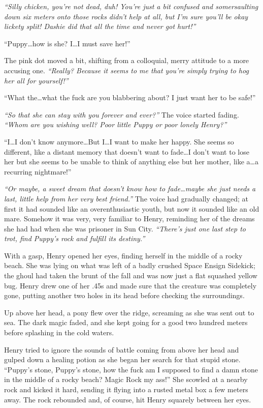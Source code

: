 \emph{``Silly chicken, you're not dead, duh! You're just a bit confused and somersaulting down six meters onto those rocks didn't help at all, but I'm sure you'll be okay lickety split! Dashie did that all the time and never got hurt!''}

``Puppy\dots how is she? I\dots I must save her!''

The pink dot moved a bit, shifting from a colloquial, merry attitude to a more accusing one. \emph{``Really? Because it seems to me that you're simply trying to hog her all for yourself!''}

``What the\dots what the fuck are you blabbering about? I just want her to be safe!''

\emph{``So that she can stay with you forever and ever?''} The voice started fading. \emph{``Whom are you wishing well? Poor little Puppy or poor lonely Henry?''}

``I\dots I don't know anymore\dots But I\dots I want to make her happy. She seems so different, like a distant memory that doesn't want to fade\dots I don't want to lose her but she seems to be unable to think of anything else but her mother, like a\dots a recurring nightmare!''

\emph{``Or maybe, a sweet dream that doesn't know how to fade\dots maybe she just needs a last, little help from her very best friend.''} The voice had gradually changed; at first it had sounded like an overenthusiastic youth, but now it sounded like an old mare. Somehow it was very, very familiar to Henry, reminding her of the dreams she had had when she was prisoner in Sun City. \emph{``There's just one last step to trot, find Puppy's rock and fulfill its destiny.''}

With a gasp, Henry opened her eyes, finding herself in the middle of a rocky beach. She was lying on what was left of a badly crushed Space Ensign Sidekick; the ghoul had taken the brunt of the fall and was now just a flat squashed yellow bug. Henry drew one of her .45s and made sure that the creature was completely gone, putting another two holes in its head before checking the surroundings.

Up above her head, a pony flew over the ridge, screaming as she was sent out to sea. The dark magic faded, and she kept going for a good two hundred meters before splashing in the cold waters.

Henry tried to ignore the sounds of battle coming from above her head and gulped down a healing potion as she began her search for that stupid stone. ``Puppy's stone, Puppy's stone, how the fuck am I supposed to find a damn stone in the middle of a rocky beach? Magic Rock my ass!'' She scowled at a nearby rock and kicked it hard, sending it flying into a rusted metal box a few meters away. The rock rebounded and, of course, hit Henry squarely between her eyes.

